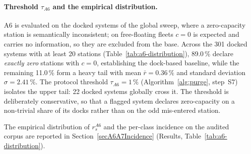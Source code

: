 \documentclass[11pt,a4paper]{article}
\begin{document}
\paragraph{Threshold $\tau_{A6}$ and the empirical distribution.}
A6 is evaluated on the docked systems of the global sweep, where a
zero-capacity station is semantically inconsistent; on free-floating
fleets $c = 0$ is expected and carries no information, so they are
excluded from the base. Across the 301 docked systems with at least
20 stations (Table~\ref{tab:a6-distribution}), 89.0\,\% declare
\emph{exactly zero} stations with $c = 0$, establishing the dock-based
baseline, while the remaining 11.0\,\% form a heavy tail with mean
$\bar r = 0.36\,\%$ and standard deviation $\hat\sigma = 2.41\,\%$.
The protocol threshold $\tau_{A6} = 1\,\%$ (Algorithm~\ref{alg:purge},
step~S7) isolates the upper tail: 22 docked systems globally cross it.
The threshold is deliberately conservative, so that a flagged system
declares zero-capacity on a non-trivial share of its docks rather than
on the odd mis-entered station.

The empirical distribution of $r_s^{A6}$ and the per-class
incidence on the audited corpus are reported in
Section~\ref{secA6A7Incidence} (Results,
Table~\ref{tab:a6-distribution}).
\end{document}
